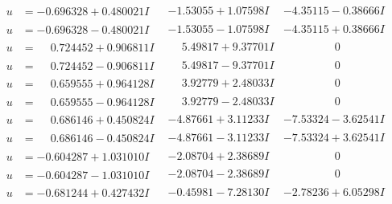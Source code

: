 \documentclass[1p]{elsarticle_modified}
\theoremstyle{definition}
\begin{document}
$$\begin{array}{c|c|c}
\begin{aligned}
u &= -0.696328 + 0.480021 I\end{aligned}
 & -1.53055 + 1.07598 I & -4.35115 - 0.38666 I \\ \hline\begin{aligned}
u &= -0.696328 - 0.480021 I\end{aligned}
 & -1.53055 - 1.07598 I & -4.35115 + 0.38666 I \\ \hline\begin{aligned}
u &= \phantom{-}0.724452 + 0.906811 I\end{aligned}
 & \phantom{-}5.49817 + 9.37701 I & \phantom{-0.000000 } 0 \\ \hline\begin{aligned}
u &= \phantom{-}0.724452 - 0.906811 I\end{aligned}
 & \phantom{-}5.49817 - 9.37701 I & \phantom{-0.000000 } 0 \\ \hline\begin{aligned}
u &= \phantom{-}0.659555 + 0.964128 I\end{aligned}
 & \phantom{-}3.92779 + 2.48033 I & \phantom{-0.000000 } 0 \\ \hline\begin{aligned}
u &= \phantom{-}0.659555 - 0.964128 I\end{aligned}
 & \phantom{-}3.92779 - 2.48033 I & \phantom{-0.000000 } 0 \\ \hline\begin{aligned}
u &= \phantom{-}0.686146 + 0.450824 I\end{aligned}
 & -4.87661 + 3.11233 I & -7.53324 - 3.62541 I \\ \hline\begin{aligned}
u &= \phantom{-}0.686146 - 0.450824 I\end{aligned}
 & -4.87661 - 3.11233 I & -7.53324 + 3.62541 I \\ \hline\begin{aligned}
u &= -0.604287 + 1.031010 I\end{aligned}
 & -2.08704 + 2.38689 I & \phantom{-0.000000 } 0 \\ \hline\begin{aligned}
u &= -0.604287 - 1.031010 I\end{aligned}
 & -2.08704 - 2.38689 I & \phantom{-0.000000 } 0 \\ \hline\begin{aligned}
u &= -0.681244 + 0.427432 I\end{aligned}
 & -0.45981 - 7.28130 I & -2.78236 + 6.05298 I \\ \hline\begin{aligned}

\end{aligned}
\end{array}$$
\end{document}
